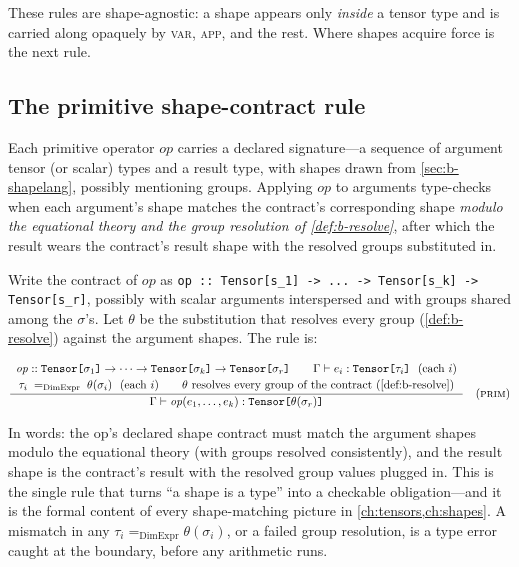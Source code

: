 \noindent These rules are shape-agnostic: a shape appears only \emph{inside} a
tensor type and is carried along opaquely by \textsc{var}, \textsc{app}, and the
rest. Where shapes acquire force is the next rule.

\subsection{The primitive shape-contract rule}
\label{sec:b-primrule}

Each primitive operator $\mathit{op}$ carries a declared signature---a sequence of
argument tensor (or scalar) types and a result type, with shapes drawn from
\cref{sec:b-shapelang}, possibly mentioning groups. Applying $\mathit{op}$ to
arguments type-checks when each argument's shape matches the contract's
corresponding shape \emph{modulo the equational theory and the group resolution of
\cref{def:b-resolve}}, after which the result wears the contract's result shape with
the resolved groups substituted in.

Write the contract of $\mathit{op}$ as
\lstinline[style=l4style]|op :: Tensor[s_1] -> ... -> Tensor[s_k] -> Tensor[s_r]|,
possibly with scalar arguments interspersed and with groups shared among the
$\sigma$'s. Let $\theta$ be the substitution that resolves every group
(\cref{def:b-resolve}) against the argument shapes. The rule is:

\[
\dfrac{
  \begin{array}{c}
  \mathit{op} :: \texttt{Tensor[}\sigma_1\texttt{]} \to \cdots \to \texttt{Tensor[}\sigma_k\texttt{]} \to \texttt{Tensor[}\sigma_r\texttt{]}
  \qquad
  \Gamma \vdash e_i : \texttt{Tensor[}\tau_i\texttt{]} \ \ (\text{each } i) \\[2pt]
  \tau_i \;=_{\text{DimExpr}}\; \theta(\sigma_i) \ \ (\text{each } i)
  \qquad
  \theta \text{ resolves every group of the contract (\cref{def:b-resolve})}
  \end{array}
}{
  \Gamma \vdash \mathit{op}(e_1,\dots,e_k) : \texttt{Tensor[}\theta(\sigma_r)\texttt{]}
}\quad(\textsc{prim})
\]

\noindent In words: the op's declared shape contract must match the argument shapes
modulo the equational theory (with groups resolved consistently), and the result
shape is the contract's result with the resolved group values plugged in. This is
the single rule that turns ``a shape is a type'' into a checkable obligation---and
it is the formal content of every shape-matching picture in
\cref{ch:tensors,ch:shapes}. A mismatch in any $\tau_i =_{\text{DimExpr}}
\theta(\sigma_i)$, or a failed group resolution, is a type error caught at the
boundary, before any arithmetic runs.

